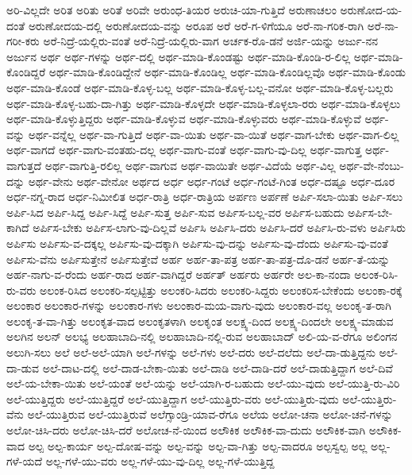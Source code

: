 {ಅರಿ-ವಿಲ್ಲದೇ
ಅರಿತ
ಅರಿತು
ಅರಿತೆ
ಅರಿವೇ
ಅರುಂಧ-ತಿಯರ
ಅರುಚಿ-ಯಾ-ಗುತ್ತಿದೆ
ಅರುಣಾಚಲಂ
ಅರುಣೋದ-ಯ-ದಂತೆ
ಅರುಣೋದಯ-ದಲ್ಲಿ
ಅರುಣೋದಯ-ವನ್ನು
ಅರೂಪ
ಅರೆ
ಅರೆ-ಗ-ಳಿಗೆಯೂ
ಅರೆ-ನಾ-ಗರಿಕ-ರಾಗಿ
ಅರೆ-ನಾ-ಗರೀ-ಕರು
ಅರೆ-ನಿದ್ರೆ-ಯಲ್ಲಿರು-ವಂತೆ
ಅರೆ-ನಿದ್ರೆ-ಯಲ್ಲಿರು-ವಾಗ
ಅರ್ಚಕ-ರೊ-ಡನೆ
ಅರ್ಜಿ-ಯನ್ನು
ಅರ್ಜು-ನನ
ಅರ್ಜುನ
ಅರ್ಥ
ಅರ್ಥ-ಗಳನ್ನು
ಅರ್ಥ-ದಲ್ಲಿ
ಅರ್ಥ-ಮಾಡಿ-ಕೊಂಡಷ್ಟು
ಅರ್ಥ-ಮಾಡಿ-ಕೊಂಡಿ-ರ-ಲಿಲ್ಲ
ಅರ್ಥ-ಮಾಡಿ-ಕೊಂಡಿದ್ದರೆ
ಅರ್ಥ-ಮಾಡಿ-ಕೊಂಡಿದ್ದೇನೆ
ಅರ್ಥ-ಮಾಡಿ-ಕೊಂಡಿಲ್ಲ
ಅರ್ಥ-ಮಾಡಿ-ಕೊಂಡಿಲ್ಲವೊ
ಅರ್ಥ-ಮಾಡಿ-ಕೊಂಡು
ಅರ್ಥ-ಮಾಡಿ-ಕೊಂಡೆ
ಅರ್ಥ-ಮಾಡಿ-ಕೊಳ್ಳ-ಬಲ್ಲ
ಅರ್ಥ-ಮಾಡಿ-ಕೊಳ್ಳ-ಬಲ್ಲ-ವನೋ
ಅರ್ಥ-ಮಾಡಿ-ಕೊಳ್ಳ-ಬಲ್ಲರು
ಅರ್ಥ-ಮಾಡಿ-ಕೊಳ್ಳ-ಬಹು-ದಾ-ಗಿತ್ತು
ಅರ್ಥ-ಮಾಡಿ-ಕೊಳ್ಳದೇ
ಅರ್ಥ-ಮಾಡಿ-ಕೊಳ್ಳಲಾ-ರರು
ಅರ್ಥ-ಮಾಡಿ-ಕೊಳ್ಳಲು
ಅರ್ಥ-ಮಾಡಿ-ಕೊಳ್ಳುತ್ತಿದ್ದರು
ಅರ್ಥ-ಮಾಡಿ-ಕೊಳ್ಳುವ
ಅರ್ಥ-ಮಾಡಿ-ಕೊಳ್ಳುವರು
ಅರ್ಥ-ಮಾಡಿ-ಕೊಳ್ಳುವೆ
ಅರ್ಥ-ವನ್ನು
ಅರ್ಥ-ವನ್ನೆಲ್ಲ
ಅರ್ಥ-ವಾ-ಗುತ್ತಿದೆ
ಅರ್ಥ-ವಾ-ಯಿತು
ಅರ್ಥ-ವಾ-ಯಿತೆ
ಅರ್ಥ-ವಾಗ-ಬೇಕು
ಅರ್ಥ-ವಾಗ-ಲಿಲ್ಲ
ಅರ್ಥ-ವಾಗದೆ
ಅರ್ಥ-ವಾಗು-ವಂತಹು-ದಲ್ಲ
ಅರ್ಥ-ವಾಗು-ವಂತೆ
ಅರ್ಥ-ವಾಗು-ವು-ದಿಲ್ಲ
ಅರ್ಥ-ವಾಗುತ್ತ
ಅರ್ಥ-ವಾಗುತ್ತದೆ
ಅರ್ಥ-ವಾಗುತ್ತಿ-ರಲಿಲ್ಲ
ಅರ್ಥ-ವಾಗುವ
ಅರ್ಥ-ವಾಯಿತೇ
ಅರ್ಥ-ವಿದೆಯೆ
ಅರ್ಥ-ವಿಲ್ಲ
ಅರ್ಥ-ವೇ-ನೆಂಬು-ದನ್ನು
ಅರ್ಥ-ವೇನು
ಅರ್ಥ-ವೇನೋ
ಅರ್ಥದ
ಅರ್ಧ
ಅರ್ಧ-ಗಂಟೆ
ಅರ್ಧ-ಗಂಟೆ-ಗಿಂತ
ಅರ್ಧ-ದಷ್ಟೂ
ಅರ್ಧ-ದೂರ
ಅರ್ಧ-ನಗ್ನ-ರಾದ
ಅರ್ಧ-ನಿಮೀಲಿತ
ಅರ್ಧ-ರಾತ್ರಿ
ಅರ್ಧ-ರಾತ್ರಿಯ
ಅರ್ಪಣ
ಅರ್ಪಣೆ
ಅರ್ಪಿ-ಸಲಾ-ಯಿತು
ಅರ್ಪಿ-ಸಲು
ಅರ್ಪಿ-ಸಿದ
ಅರ್ಪಿ-ಸಿದ್ದ
ಅರ್ಪಿ-ಸಿದ್ದೆ
ಅರ್ಪಿ-ಸುತ್ತ
ಅರ್ಪಿ-ಸುವ
ಅರ್ಪಿಸ-ಬಲ್ಲ-ವರ
ಅರ್ಪಿಸ-ಬಹುದು
ಅರ್ಪಿಸ-ಬೇ-ಕಾಗಿದೆ
ಅರ್ಪಿಸ-ಬೇಕು
ಅರ್ಪಿಸ-ಲಾಗು-ವು-ದಿಲ್ಲವೆ
ಅರ್ಪಿಸಿ
ಅರ್ಪಿಸಿ-ದರು
ಅರ್ಪಿಸಿ-ದರೆ
ಅರ್ಪಿಸಿ-ರು-ವಳು
ಅರ್ಪಿಸಿರು
ಅರ್ಪಿಸು
ಅರ್ಪಿಸು-ವ-ದಕ್ಕಲ್ಲ
ಅರ್ಪಿಸು-ವು-ದಕ್ಕಾಗಿ
ಅರ್ಪಿಸು-ವು-ದನ್ನು
ಅರ್ಪಿಸು-ವು-ದೆಂದು
ಅರ್ಪಿಸು-ವು-ವಂತೆ
ಅರ್ಪಿಸು-ವೆನು
ಅರ್ಪಿಸುತ್ತೇನೆ
ಅರ್ಪಿಸುತ್ತೇವೆ
ಅರ್ಹ
ಅರ್ಹ-ತಾ-ಪತ್ರ
ಅರ್ಹ-ತಾ-ಪತ್ರ-ದೊ-ಡನೆ
ಅರ್ಹ-ತೆ-ಯನ್ನು
ಅರ್ಹ-ನಾಗು-ವ-ರೆಂದು
ಅರ್ಹ-ರಾದ
ಅರ್ಹ-ವಾಗಿದ್ದರೆ
ಅರ್ಹತ್
ಅರ್ಹರು
ಅರ್ಹರೇ
ಅಲ-ಕಾ-ನಂದಾ
ಅಲಂಕ-ರಿಸಿ-ರು-ವರು
ಅಲಂಕ-ರಿಸಿದ
ಅಲಂಕರಿ-ಸಲ್ಪಟ್ಟಿತ್ತು
ಅಲಂಕರಿ-ಸಿದರು
ಅಲಂಕರಿ-ಸಿದ್ದರು
ಅಲಂಕರಿಸ-ಬೇಕೆಂದು
ಅಲಂಕಾ-ರಕ್ಕೆ
ಅಲಂಕಾರ
ಅಲಂಕಾರ-ಗಳನ್ನು
ಅಲಂಕಾರ-ಗಳು
ಅಲಂಕಾರ-ಮಯ-ವಾಗು-ವುದು
ಅಲಂಕಾರ-ವಲ್ಲ
ಅಲಂಕೃ-ತ-ರಾಗಿ
ಅಲಂಕೃ-ತ-ವಾ-ಗಿತ್ತು
ಅಲಂಕೃತ-ವಾದ
ಅಲಂಕೃತಳಾಗಿ
ಅಲಕೃಂತ
ಅಲಕ್ಷ್ಯ-ದಿಂದ
ಅಲಕ್ಷ್ಯ-ದಿಂದಲೇ
ಅಲಕ್ಷ್ಯ-ಮಾಡುವ
ಅಲಗಿನ
ಅಲನ್
ಅಲಭ್ಯ
ಅಲಹಾಬಾದಿ-ನಲ್ಲಿ
ಅಲಹಾಬಾದಿ-ನಲ್ಲಿ-ರುವ
ಅಲಹಾಬಾದ್
ಅಲಿ-ಯ-ವ-ರೆಗೂ
ಅಲಿಂಗನ
ಅಲುಗಿ-ಸಲು
ಅಲೆ
ಅಲೆ-ಅಲೆ-ಯಾಗಿ
ಅಲೆ-ಗಳನ್ನು
ಅಲೆ-ಗಳು
ಅಲೆ-ದರು
ಅಲೆ-ದಲೆದು
ಅಲೆ-ದಾ-ಡುತ್ತಿದ್ದನು
ಅಲೆ-ದಾ-ಡುವ
ಅಲೆ-ದಾಟ-ದಲ್ಲಿ
ಅಲೆ-ದಾಡ-ಬೇಕಾ-ಯಿತು
ಅಲೆ-ದಾಡಿ
ಅಲೆ-ದಾಡಿ-ದರೆ
ಅಲೆ-ದಾಡುತ್ತಿದ್ದಾಗ
ಅಲೆ-ದಿವೆ
ಅಲೆ-ಯ-ಬೇಕಾ-ಯಿತು
ಅಲೆ-ಯಂತೆ
ಅಲೆ-ಯನ್ನು
ಅಲೆ-ಯಾಗಿ-ರ-ಬಹುದು
ಅಲೆ-ಯು-ವುದು
ಅಲೆ-ಯುತ್ತಿ-ರು-ವಿರಿ
ಅಲೆ-ಯುತ್ತಿದ್ದರು
ಅಲೆ-ಯುತ್ತಿದ್ದರೆ
ಅಲೆ-ಯುತ್ತಿದ್ದಾಗ
ಅಲೆ-ಯುತ್ತಿರು-ವರು
ಅಲೆ-ಯುತ್ತಿರು-ವುದು
ಅಲೆ-ಯುತ್ತಿರು-ವೆನು
ಅಲೆ-ಯುತ್ತಿರುವ
ಅಲೆ-ಯುತ್ತಿರುವೆ
ಅಲೆಗ್ಸಾಂಡ್ರಿ-ಯಾವ-ರೆಗೂ
ಅಲೆಯ
ಅಲೋ-ಚನಾ
ಅಲೋ-ಚನೆ-ಗಳನ್ನು
ಅಲೋ-ಚಿಸಿ-ದರು
ಅಲೋ-ಚಿಸಿ-ದರೆ
ಅಲೋಚ-ನೆ-ಯಿಂದ
ಅಲೌಕಿಕ
ಅಲೌಕಿಕ-ವಾ-ದುದು
ಅಲೌಕಿಕ-ವಾಗಿ
ಅಲೌಕಿಕ-ವಾದ
ಅಲ್ಪ
ಅಲ್ಪ-ಕಾರ್ಯ
ಅಲ್ಪ-ದೋಷ-ವನ್ನು
ಅಲ್ಪ-ವನ್ನು
ಅಲ್ಪ-ವಾ-ಗಿತ್ತು
ಅಲ್ಪ-ವಾದರೂ
ಅಲ್ಪಸ್ವಲ್ಪ
ಅಲ್ಲ
ಅಲ್ಲ-ಗಳೆ-ಯದೆ
ಅಲ್ಲ-ಗಳೆ-ಯು-ವರು
ಅಲ್ಲ-ಗಳೆ-ಯು-ವು-ದಿಲ್ಲ
ಅಲ್ಲ-ಗಳೆ-ಯುತ್ತಿದ್ದ
}
